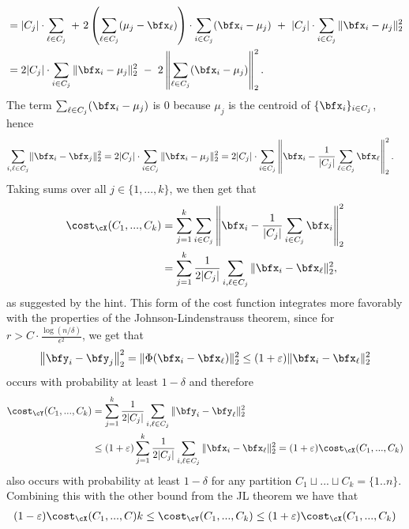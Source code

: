 \begin{homework}[e]
\begin{prf}
\begin{enumerate}[(a)]
\begin{align*}
            &= |C_j|\cdot \sum_{\ell\in C_j} ~+~ 2\left(\sum_{\ell \in C_j}(\mu_j - \bfx_\ell)\right)\cdot \sum_{i\in C_j}(\bfx_i - \mu_j) ~+~ |C_j|\cdot\sum_{i\in C_j} \|\bfx_i - \mu_j\|^2_2 \\
            &= 2|C_j|\cdot \sum_{i\in C_j} \|\bfx_i - \mu_j\|^2_2 ~-~ 2 \left\|\sum_{\ell \in C_j}(\bfx_i - \mu_j)\right\|^2_2.
        \end{align*}
        The term $\sum_{\ell \in C_j}(\bfx_i - \mu_j)$ is $0$ because $\mu_j$ is the centroid of $\{\bfx_i\}_{i\in C_j}$, hence
        \begin{align*}
          \sum_{i,\ell\in C_j} &\|\bfx_i - \bfx_j\|^2_2 
          = 2|C_j|\cdot \sum_{i\in C_j} \|\bfx_i - \mu_j \|^2_2 = 2|C_j|\cdot \sum_{i\in C_j} \left\|\bfx_i -  \frac{1}{|C_j|}\sum_{\ell \in C_j}\bfx_\ell\right\|^2_2.
        \end{align*}
        Taking sums over all $j \in \{1,...,k\}$, we then get that
        \begin{align*}
          \cost_\cX(C_1,...,C_k) &= \sum_{j=1}^k\sum_{i \in C_j} \left\|\bfx_i - \frac{1}{|C_j|}\sum_{i\in C_j} \bfx_i\right\|^2_2 \\
                                  &= \sum_{j=1}^k \frac{1}{2|C_j|}\sum_{i,\ell \in C_j}\|\bfx_i - \bfx_\ell\|^2_2,
        \end{align*}
        as suggested by the hint. This form of the cost function integrates more favorably with the properties of the Johnson-Lindenstrauss theorem, since for $r > C\cdot \frac{\log(n/\delta)}{\epsilon^2}$, we get that
        \begin{align*}
          \left\|\bfy_i - \bfy_j\right\|^2_2  = \|\Phi(\bfx_i - \bfx_\ell)\|^2_2 \leq (1 + \epsilon)\|\bfx_i - \bfx_\ell\|^2_2
        \end{align*}
        occurs with probability at least $1 - \delta$ and therefore
        \begin{align*}
          \cost_\cY(C_1,...,C_k) &= \sum_{j=1}^k\frac{1}{2|C_j|}\sum_{i,\ell\in C_j} \|\bfy_i - \bfy_\ell\|^2_2 \\
          &\leq (1 + \epsilon)\sum_{j=1}^k\frac{1}{2|C_j|}\sum_{i,\ell\in C_j} \|\bfx_i - \bfx_\ell\|^2_2 = (1+\epsilon)\cost_\cX(C_1,...,C_k)
        \end{align*}
        also occurs with probability at least $1 - \delta$ for any partition $C_1 \sqcup ... \sqcup C_k = \{1..n\}$. Combining this with the other bound from the JL theorem we have that
        \begin{align*}
          (1-\epsilon)\cost_\cX(C_1,...,C)k \leq \cost_\cY(C_1,...,C_k) \leq (1+\epsilon)\cost_\cX(C_1,...,C_k)

\end{align*}
\end{enumerate}
\end{prf}
\end{homework}

